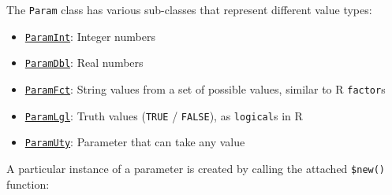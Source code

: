 \documentclass[]{scrbook}
\newenvironment{Shaded}{\begin{snugshade}}{\end{snugshade}}
\newcommand{\ControlFlowTok}[1]{\textcolor[rgb]{0.13,0.29,0.53}{\textbf{#1}}}
\newcommand{\DataTypeTok}[1]{\textcolor[rgb]{0.13,0.29,0.53}{#1}}
\newcommand{\DecValTok}[1]{\textcolor[rgb]{0.00,0.00,0.81}{#1}}
\newcommand{\KeywordTok}[1]{\textcolor[rgb]{0.13,0.29,0.53}{\textbf{#1}}}
\newcommand{\NormalTok}[1]{#1}
\newcommand{\OperatorTok}[1]{\textcolor[rgb]{0.81,0.36,0.00}{\textbf{#1}}}
\newcommand{\OtherTok}[1]{\textcolor[rgb]{0.56,0.35,0.01}{#1}}
\newcommand{\StringTok}[1]{\textcolor[rgb]{0.31,0.60,0.02}{#1}}
\providecommand{\tightlist}{%
  \setlength{\itemsep}{0pt}\setlength{\parskip}{0pt}}
\renewenvironment{Shaded} {\begin{snugshade}\small} {\end{snugshade}}
\begin{document}
The \texttt{Param} class has various sub-classes that represent different value types:

\begin{itemize}
\tightlist
\item
  \href{https://paradox.mlr-org.com/reference/ParamInt.html}{\texttt{ParamInt}}: Integer numbers
\item
  \href{https://paradox.mlr-org.com/reference/ParamDbl.html}{\texttt{ParamDbl}}: Real numbers
\item
  \href{https://paradox.mlr-org.com/reference/ParamFct.html}{\texttt{ParamFct}}: String values from a set of possible values, similar to R \texttt{factor}s
\item
  \href{https://paradox.mlr-org.com/reference/ParamLgl.html}{\texttt{ParamLgl}}: Truth values (\texttt{TRUE} / \texttt{FALSE}), as \texttt{logical}s in R
\item
  \href{https://paradox.mlr-org.com/reference/ParamUty.html}{\texttt{ParamUty}}: Parameter that can take any value
\end{itemize}

A particular instance of a parameter is created by calling the attached \texttt{\$new()} function:

\begin{Shaded}
\end{Shaded}
\end{document}
